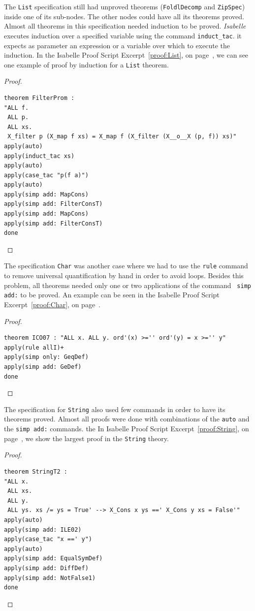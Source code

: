 \documentclass[12pt,twoside]{article}
\numberwithin{spec}{subsection}
\numberwithin{proof}{subsection}
\numberwithin{figure}{subsection}
\numberwithin{code}{subsection}
\newcommand{\citeProof}[1]{Isabelle Proof Script Excerpt~\ref{#1}, on page~\pageref{#1}}
\begin{document}
The \verb.List. specification still had unproved theorems (\verb.FoldlDecomp. and \verb.ZipSpec.) inside one of its sub-nodes. The other nodes could have all its theorems proved. Almost all theorems in this specification needed induction to be proved. \textit{Isabelle} executes induction over a specified variable using the command \verb.induct_tac.. it expects as parameter an expression or a variable over which to execute the induction. In the \citeProof{proof:List}, we can see one example of proof by induction for a \verb.List. theorem.

\begin{proof}\capstart
\begin{verbatim}
theorem FilterProm :
"ALL f.
 ALL p.
 ALL xs.
 X_filter p (X_map f xs) = X_map f (X_filter (X__o__X (p, f)) xs)"
apply(auto)
apply(induct_tac xs)
apply(auto)
apply(case_tac "p(f a)")
apply(auto)
apply(simp add: MapCons)
apply(simp add: FilterConsT)
apply(simp add: MapCons)
apply(simp add: FilterConsT)
done
\end{verbatim}
\caption{Proof for theorem FilterProm from specification List.}
\label{proof:List}
\end{proof}

The specification \verb.Char. was another case where we had to use the \verb.rule. command to remove universal quantification by hand in order to avoid loops. Besides this problem, all theorems needed only one or two applications of the command \verb. simp add:. to be proved. An example can be seen in the \citeProof{proof:Char}.

\begin{proof}\capstart
\begin{verbatim}
theorem ICO07 : "ALL x. ALL y. ord'(x) >='' ord'(y) = x >='' y"
apply(rule allI)+
apply(simp only: GeqDef)
apply(simp add: GeDef)
done
\end{verbatim}
\caption{Proof for theorem ICO07 from specification Char.}
\label{proof:Char}
\end{proof}

The specification for \verb.String. also used few commands in order to have its theorems proved. Almost all proofs were done with combinations of the \verb.auto. and the \verb.simp add:. commands. the In \citeProof{proof:String}, we show the largest proof in the \verb.String. theory.

\begin{proof}\capstart
\begin{verbatim}
theorem StringT2 :
"ALL x.
 ALL xs.
 ALL y.
 ALL ys. xs /= ys = True' --> X_Cons x ys ==' X_Cons y xs = False'"
apply(auto)
apply(simp add: ILE02)
apply(case_tac "x ==' y")
apply(auto)
apply(simp add: EqualSymDef)
apply(simp add: DiffDef)
apply(simp add: NotFalse1)
done
\end{verbatim}
\caption{Proof for theorem StringT2 from specification String.}
\label{proof:String}
\end{proof}
\end{document}
